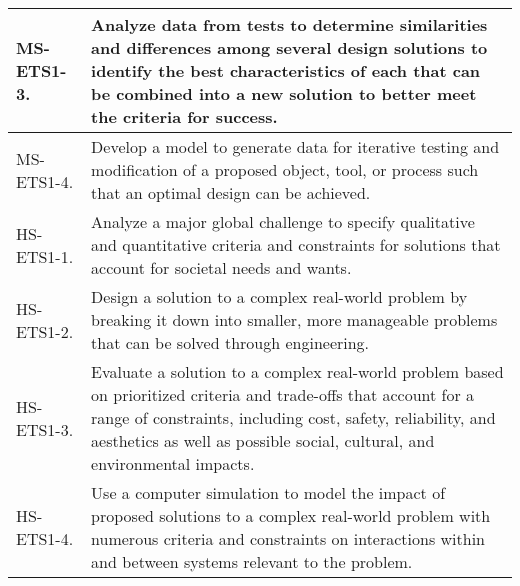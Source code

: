 \begin{longtable}{p{1.8cm}p{11cm}}
MS-ETS1-3. & Analyze data from tests to determine similarities and differences among several design solutions to identify the best characteristics of each that can be combined into a new solution to better meet the criteria for success.\\ \hline
MS-ETS1-4. & Develop a model to generate data for iterative testing and modification of a proposed object, tool, or process such that an optimal design can be achieved.\\ \hline
HS-ETS1-1. & Analyze a major global challenge to specify qualitative and quantitative criteria and constraints for solutions that account for societal needs and wants.\\ \hline
HS-ETS1-2. & Design a solution to a complex real-world problem by breaking it down into smaller, more manageable problems that can be solved through engineering.\\ \hline
HS-ETS1-3. & Evaluate a solution to a complex real-world problem based on prioritized criteria and trade-offs that account for a range of constraints, including cost, safety, reliability, and aesthetics as well as possible social, cultural, and environmental impacts.\\ \hline
HS-ETS1-4. & Use a computer simulation to model the impact of proposed solutions to a complex real-world problem with numerous criteria and constraints on interactions within and between systems relevant to the problem.\\ \hline
\end{longtable}		